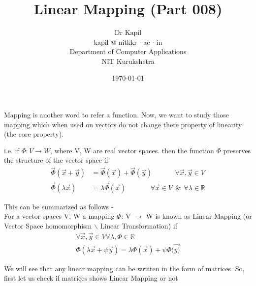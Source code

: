 \documentclass{article}
\title{Linear Mapping (Part 008)}
\author{Dr Kapil\\kapil $@$ nitkkr $\cdot$ ac $\cdot$ in\\ Department of Computer Applications\\ NIT Kurukshetra}
\date{\today}
\begin{document}
\maketitle
\thispagestyle{fancy}

Mapping is another word to refer a function. Now, we want to study those mapping which when used on vectors do not change there property of linearity (the core property).

i.e. if \( \Phi : V \rightarrow W \), where V, W are real vector spaces. then the function $\Phi$ preserves the structure of the vector space if
\begin{align}
\Vec{\Phi}(\Vec{x} + \Vec{y}) &= \Vec{\Phi}(\Vec{x}) + \Vec{\Phi}(\Vec{y}) ~~~~~~~~~~~~~~~\forall \Vec{x},\Vec{y} \in V \nonumber \\
\Vec{\Phi}(\lambda \Vec{x}) &= \lambda \Vec{\Phi}(\Vec{x}) ~~~~~~~~~~~~~~~~ \forall \Vec{x} \in V ~~ \& ~~ \forall \lambda \in \mathbb{R} \nonumber
\end{align}

This can be summarized as follows - \\
For a vector spaces V, W a mapping $\Phi$: V $\rightarrow$ W is known as Linear Mapping (or Vector Space homomorphism  $\backslash$ Linear Transformation) if 
\begin{align}
    \forall \Vec{x}, \Vec{y} \in V \forall \lambda , \Phi \in \mathbb{R} \nonumber \\
    \Phi (\lambda \Vec{x} + \psi \Vec{y}) = \lambda \Phi (\Vec{x}) + \psi \Phi (\Vec{y)} \nonumber
\end{align}

We will see that any linear mapping can be written in the form of matrices.
So, first let us check if matrices shows Linear Mapping or not\\
\end{document}

